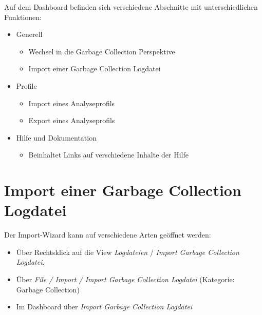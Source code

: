 Auf dem Dashboard befinden sich verschiedene Abschnitte mit unterschiedlichen Funktionen:
\begin{itemize}
	\item Generell 
		\begin{itemize}
			\item Wechsel in die Garbage Collection Perspektive
			\item Import einer Garbage Collection Logdatei
		\end{itemize}
	\item Profile
		\begin{itemize}
			\item Import eines Analyseprofils
			\item Export eines Analyseprofils
		\end{itemize}
	\item Hilfe und Dokumentation
		\begin{itemize}
			\item Beinhaltet Links auf verschiedene Inhalte der Hilfe
		\end{itemize}
\end{itemize}

\section{Import einer Garbage Collection Logdatei}
Der Import-Wizard kann auf verschiedene Arten geöffnet werden:
\begin{itemize}
	\item Über Rechtsklick auf die View \textit{Logdateien} / \textit{Import Garbage Collection Logdatei}.
	\item Über \textit{File / Import / Import Garbage Collection Logdatei} (Kategorie: Garbage Collection)
	\item Im Dashboard über \textit{Import Garbage Collection Logdatei}
\end{itemize}

